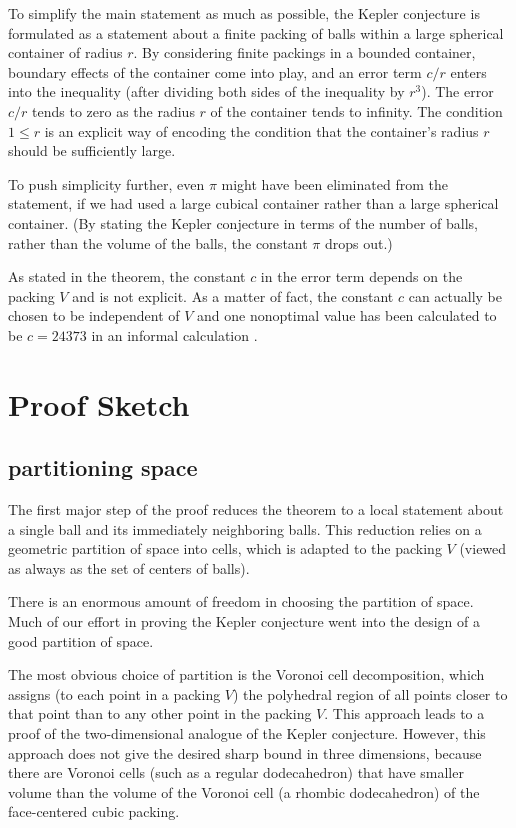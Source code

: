 \documentclass{amsart}
\begin{document}
To simplify the main statement as much as possible, the Kepler
conjecture is formulated as a statement about a finite
packing of balls within a large spherical container of radius $r$.  By
considering finite packings in a bounded container, boundary effects
of the container come into play, and an error term $c/r$ enters into
the inequality (after dividing both sides of the inequality by $r^3$).  
The error $c/r$ tends to zero as the radius $r$ of
the container tends to infinity.
The condition $1\le r$ is an explicit way of encoding the
condition that the container's radius $r$ should be sufficiently large.  

To push simplicity further, even $\pi$ might have been eliminated from
the statement, if we had used a large cubical container rather than a
large spherical container.  (By stating the Kepler conjecture in terms
of the number of balls, rather than the volume of the balls, the
constant $\pi$ drops out.)

As stated in the theorem, the constant $c$ in the error term depends
on the packing $V$ and is not explicit.  As a matter of fact, the
constant $c$ can actually be chosen to be independent of $V$ and one
nonoptimal value has been calculated to be $c=24373$ in an informal
calculation \cite{Scharf}.





\section{Proof Sketch}

\subsection{partitioning space}

The first major step of the proof reduces the theorem to a local
statement about a single ball and its immediately neighboring balls.
This reduction relies on a geometric partition of space into cells,
which is adapted to the packing $V$ (viewed as always as the set of
centers of balls).

There is an enormous amount of freedom in choosing the partition
of space.  Much of our effort in proving the Kepler conjecture
went into the design of a good partition of space.  

The most obvious choice of partition is the Voronoi cell
decomposition, which assigns (to each point in a packing $V$) the
polyhedral region of all points closer to that point than to any other
point in the packing $V$. This approach leads to a proof of the
two-dimensional analogue of the Kepler conjecture.  However, this
approach does not give the desired sharp bound in three dimensions,
because there are Voronoi cells (such as a regular dodecahedron) that
have smaller volume than the volume of the Voronoi cell (a rhombic
dodecahedron) of the face-centered cubic packing.
\end{document}
